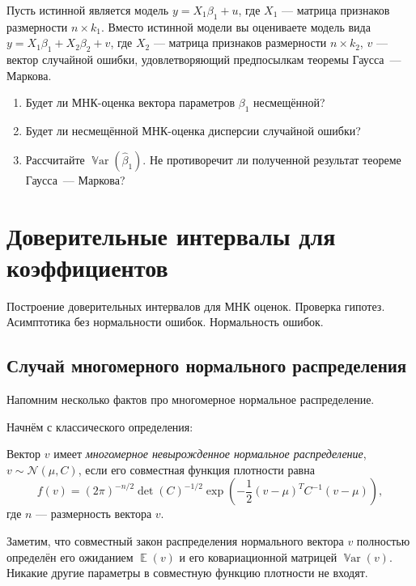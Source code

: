 \documentclass[12pt]{article}
\DeclareMathOperator{\Var}{\mathbb{V}ar}
\DeclareMathOperator{\E}{\mathbb{E}}
\newcommand{\cN}{\mathcal{N}}
\renewcommand{\b}{\beta}
\newcommand{\hb}{\hat{\beta}}
\begin{document}
\begin{problem}
Пусть истинной является модель $y = X_1\b_1+u$, где $X_1$ — матрица признаков размерности $n \times k_1$. Вместо истинной модели вы оцениваете модель вида $y = X_1\b_1+ X_2\b_2+v$, где $X_2$  — матрица признаков размерности  $n \times k_2$, $v$ — вектор случайной ошибки, удовлетворяющий предпосылкам теоремы Гаусса~— Маркова.
\begin{enumerate}
    \item Будет ли МНК-оценка вектора параметров $\b_1$ несмещённой?
    \item Будет ли несмещённой МНК-оценка дисперсии случайной ошибки?
    \item Рассчитайте $\Var(\hb_1)$. Не противоречит ли полученной результат теореме Гаусса~— Маркова?
\end{enumerate}
\end{problem}

\section{Доверительные интервалы для коэффициентов}
Построение доверительных интервалов для МНК оценок. Проверка гипотез. Асимптотика без нормальности ошибок. Нормальность ошибок.


\subsection{Случай многомерного нормального распределения}


Напомним несколько фактов про многомерное нормальное распределение.


Начнём с классического определения:
\begin{definition}
Вектор $v$ имеет \emph{многомерное невырожденное нормальное распределение}, $v \sim \cN(
\mu, C)$, если его совместная функция плотности равна 
\[
f(v) = (2\pi)^{-n/2} \det(C)^{-1/2} \exp\left(-\frac{1}{2}(v - \mu)^T C^{-1}(v-\mu)\right),
\]    
где $n$ — размерность вектора $v$.
\end{definition}

Заметим, что совместный закон распределения нормального вектора $v$ полностью определён его ожиданием $\E(v)$ и его ковариационной матрицей $\Var(v)$.
Никакие другие параметры в совместную функцию плотности не входят. 
\end{document}
